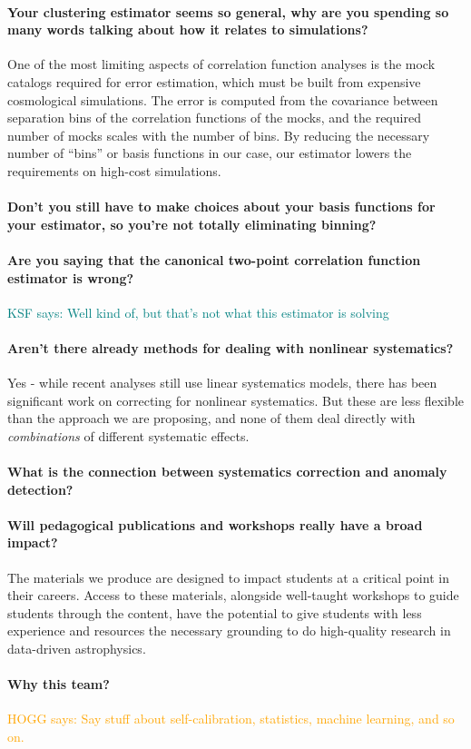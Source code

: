 \documentclass[12pt, fullpage, letterpaper]{article}
\newcommand{\KSF}[1]{\textcolor{teal}{KSF says: #1}}
\newcommand{\HOGG}[1]{\textcolor{orange}{HOGG says: #1}}
\begin{document}
\paragraph{Your clustering estimator seems so general, why are you spending so many words talking about how it relates to simulations?}
One of the most limiting aspects of correlation function analyses is the mock catalogs required for error estimation, which must be built from expensive cosmological simulations. The error is computed from the covariance between separation bins of the correlation functions of the mocks, and the required number of mocks scales with the number of bins. By reducing the necessary number of ``bins'' or basis functions in our case, our estimator lowers the requirements on high-cost simulations.

\paragraph{Don't you still have to make choices about your basis functions for your estimator, so you're not totally eliminating binning?}

\paragraph{Are you saying that the canonical two-point correlation function estimator is wrong?} \KSF{Well kind of, but that's not what this estimator is solving}

\paragraph{Aren't there already methods for dealing with nonlinear systematics?} Yes - while recent analyses still use linear systematics models, there has been significant work on correcting for nonlinear systematics. But these are less flexible than the approach we are proposing, and none of them deal directly with \emph{combinations} of different systematic effects.

\paragraph{What is the connection between systematics correction and anomaly detection?}

\paragraph{Will pedagogical publications and workshops really have a broad impact?}
The materials we produce are designed to impact students at a critical point in their careers. Access to these materials, alongside well-taught workshops to guide students through the content, have the potential to give students with less experience and resources the necessary grounding to do high-quality research in data-driven astrophysics.

\paragraph{Why this team?}
\HOGG{Say stuff about self-calibration, statistics, machine learning, and so on.}

\clearpage


\end{document}
